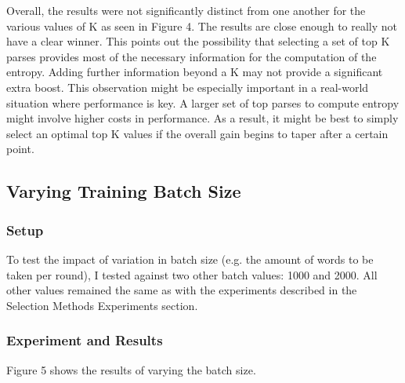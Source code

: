 \documentclass{article} %
\begin{document}
Overall, the results were not significantly distinct from one another for the various values of K as seen in Figure 4. The results are close enough to really not have a clear winner. This points out the possibility that selecting a set of top K parses provides most of the necessary information for the computation of the entropy. Adding further information beyond a K may not provide a significant extra boost. This observation might be especially important in a real-world situation where performance is key. A larger set of top parses to compute entropy might involve higher costs in performance. As a result, it might be best to simply select an optimal top K values if the overall gain begins to taper after a certain point. 

\subsection{Varying Training Batch Size}

\subsubsection{Setup}

To test the impact of variation in batch size (e.g. the amount of words to be taken per round), I tested against two other batch values: 1000 and 2000. All other values remained the same as with the experiments described in the Selection Methods Experiments section.

\subsubsection{Experiment and Results}

Figure 5 shows the results of varying the batch size.
\end{document}
